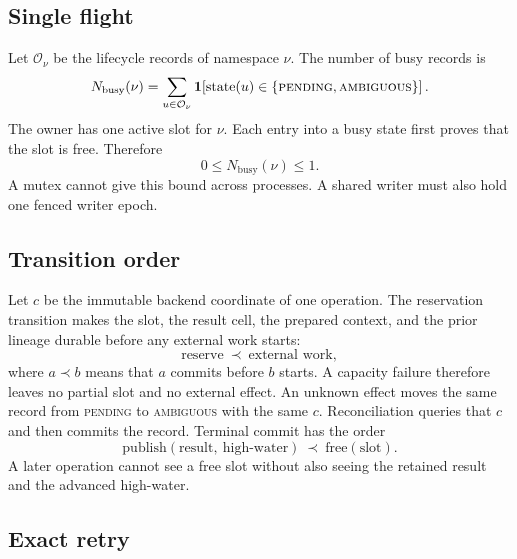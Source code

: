 \documentclass[11pt,a4paper]{article}
\theoremstyle{definition}
\newcommand{\st}{\operatorname{state}}
\newcommand{\ind}[1]{\mathbf{1}\!\left[#1\right]}
\begin{document}

\subsection{Single flight}

Let $\mathcal{O}_\nu$ be the lifecycle records of namespace $\nu$. The number of busy
records is
\begin{equation}\label{eq:busy-count}
N_{\mathrm{busy}}(\nu)=\sum_{u\in\mathcal{O}_\nu}
\ind{\st(u)\in\{\textsc{pending},\textsc{ambiguous}\}}.
\end{equation}
The owner has one active slot for $\nu$. Each entry into a busy state first proves that
the slot is free. Therefore
\begin{equation}\label{eq:single-flight}
0\leq N_{\mathrm{busy}}(\nu)\leq1.
\end{equation}
A mutex cannot give this bound across processes. A shared writer must also hold one
fenced writer epoch.

\subsection{Transition order}

Let $c$ be the immutable backend coordinate of one operation. The reservation
transition makes the slot, the result cell, the prepared context, and the prior lineage
durable before any external work starts:
\begin{equation}\label{eq:reserve-order}
\mathrm{reserve}\ \prec\ \text{external work},
\end{equation}
where $a\prec b$ means that $a$ commits before $b$ starts. A capacity failure therefore
leaves no partial slot and no external effect. An unknown effect moves the same record
from \textsc{pending} to \textsc{ambiguous} with the same $c$. Reconciliation queries
that $c$ and then commits the record. Terminal commit has the order
\begin{equation}\label{eq:commit-order}
\mathrm{publish}(\text{result},\ \text{high-water})\ \prec\
\mathrm{free}(\text{slot}).
\end{equation}
A later operation cannot see a free slot without also seeing the retained result and
the advanced high-water.

\subsection{Exact retry}
\end{document}
